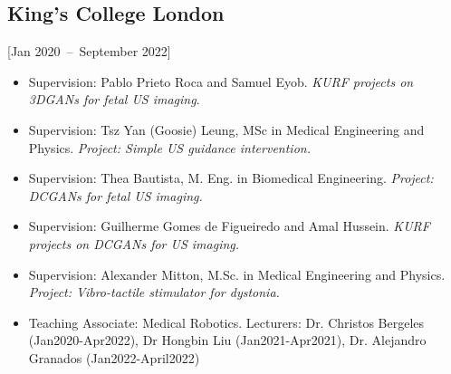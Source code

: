 \documentclass{mycv}
\begin{document}
\subsection{King's College London}[Jan 2020~--~September 2022]
\begin{itemize}
	\item 	Supervision: Pablo Prieto Roca and Samuel Eyob. 
		\textit{KURF projects on 3DGANs for fetal US imaging}. 
	\item 	Supervision: Tsz Yan (Goosie) Leung, MSc in Medical Engineering and Physics. 
		\textit{Project: Simple US guidance intervention.} 
	\item 	Supervision: Thea Bautista, M. Eng. in Biomedical Engineering. 
		\textit{Project: DCGANs for fetal US imaging.} 
	\item 	Supervision: Guilherme Gomes de Figueiredo and Amal Hussein. 
		\textit{KURF projects on DCGANs for US imaging.}
	\item 	Supervision: Alexander Mitton, M.Sc. in Medical Engineering and Physics. 
		\textit{Project: Vibro-tactile stimulator for dystonia.}
	\item Teaching Associate: Medical Robotics. Lecturers: Dr. Christos Bergeles (Jan2020-Apr2022), Dr Hongbin Liu (Jan2021-Apr2021), Dr. Alejandro Granados (Jan2022-April2022) 
\end{itemize}




\end{document}
